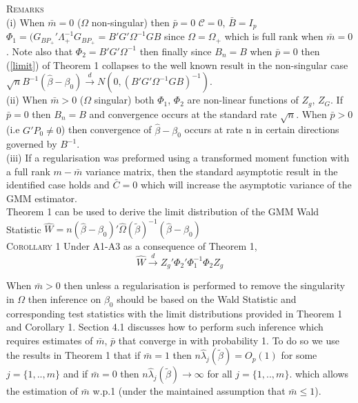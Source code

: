 \documentclass[11pt, fleqn]{article}
\begin{document}
  \textsc{Remarks}\\
(i) When $\bar{m}=0$ ($\Omega$ non-singular) then $\bar{p}=0$ $\mathcal{C}=0$, $\bar{B}=I_p$ $\Phi_1=(G_{BP_+}'\Lambda_+^{-1}G_{BP_+}=B'G'\Omega^{-1}GB$ since $\Omega=\Omega_+$ which is full rank when $\bar{m}=0$. Note also that $\Phi_2=B'G'\Omega^{-1}$ then finally since $B_n=B$ when $\bar{p}=0$ then (\ref{limit}) of Theorem 1 collapses to the well known  result in the non-singular case $\sqrt{n}B^{-1}(\hat{\beta}-\beta_0)\overset{d}{\rightarrow} N(0,(B'G'\Omega^{-1}GB)^{-1}).$\\
(ii)  When $\bar{m}>0$ ($\Omega$ singular) both $\Phi_1$, $\Phi_2$ are non-linear functions of $Z_g$, $Z_G$. If $\bar{p}=0$ then $B_n=B$ and convergence occurs at the standard rate $\sqrt{n}$. When $\bar{p}>0$ (i.e $G'P_0\neq 0$) then convergence  of $\hat{\beta}-\beta_0$ occurs at rate n in certain directions governed by $B^{-1}$.\\
(iii) If a regularisation was preformed using a transformed moment function with a full rank $m-\bar{m}$ variance matrix, then the standard asymptotic result in the identified case holds and $\bar{C}=0$ which will increase the asymptotic variance of the GMM estimator.\\





Theorem 1 can be used to derive the limit distribution of the  GMM Wald Statistic $\hat{W}=n(\hat{\beta}-\beta_0)'\hat{\Omega}(\tilde{\beta})^{-1}(\hat{\beta}-\beta_0)$\\

\textsc{Corollary 1} Under A1-A3 as a consequence of Theorem 1,
\begin{equation} \hat{W}\overset{d}{\rightarrow} Z_g'\Phi_2'\Phi_1^{-1}\Phi_2 Z_g\end{equation}


When $\bar{m}>0$ then unless a regularisation is performed to remove the singularity in $\Omega$ then inference on $\beta_0$ should be based on the Wald Statistic and corresponding test statistics with the limit distributions provided in Theorem 1 and Corollary 1. Section  4.1 discusses how to perform such inference which requires estimates of $\bar{m}$, $\bar{p}$ that converge in with probability 1. To do so we use the results in Theorem 1 that if $\bar{m}=1$ then $n\hat{\lambda}_j(\tilde{\beta})=O_p(1)$ for some $j=\{1,..,m\}$ and if $\bar{m}=0$ then $ n\hat{\lambda}_j(\tilde{\beta})\rightarrow \infty$  for all $j=\{1,..,m\}.$ which allows the estimation of $\bar{m}$ w.p.1 (under the maintained assumption that $\bar{m}\leq 1$).
\end{document}
